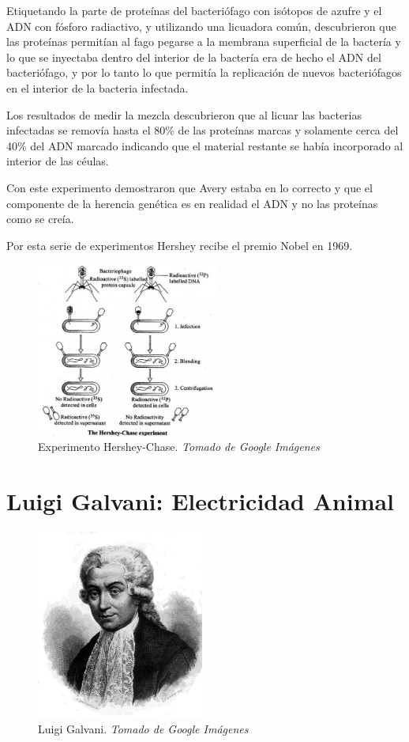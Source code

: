 \documentclass[journal]{IEEEtran}
\begin{document}
Etiquetando la parte de proteínas  del bacteriófago con isótopos de azufre y el ADN con fósforo radiactivo, y utilizando una licuadora común, descubrieron que las proteínas permitían al fago
pegarse a la membrana superficial de la bactería y lo que se inyectaba dentro del interior de la bactería era de hecho el ADN del bacteriófago, y por lo tanto lo
que permitía la replicación de nuevos bacteriófagos en el interior de la bacteria infectada.

Los resultados de medir la mezcla descubrieron que al licuar las bacterias infectadas se removía hasta el 80\% de las proteínas marcas y solamente cerca del 40\% del ADN marcado
indicando que el material restante se había incorporado al interior de las céulas.

Con este experimento demostraron que Avery estaba en lo correcto y que el componente de la herencia genética
es en realidad el ADN y no las proteínas como se creía.

Por esta serie de experimentos Hershey recibe el premio Nobel en 1969.\cite{hernandez_2019}
\begin{center}
  \begin{figure}[h!]
  \includegraphics[width=60mm]{hershey.jpg}
  \caption{Experimento Hershey-Chase. \emph{Tomado de Google Imágenes}}
  \end{figure}
\end{center}

\section{Luigi Galvani: Electricidad Animal}

\begin{center}
  \begin{figure}[h!]
  \includegraphics[width=55mm]{Luigi_Galvani.jpg}
  \caption{Luigi Galvani. \emph{Tomado de Google Imágenes}}
  \end{figure}
\end{center}
\end{document}
